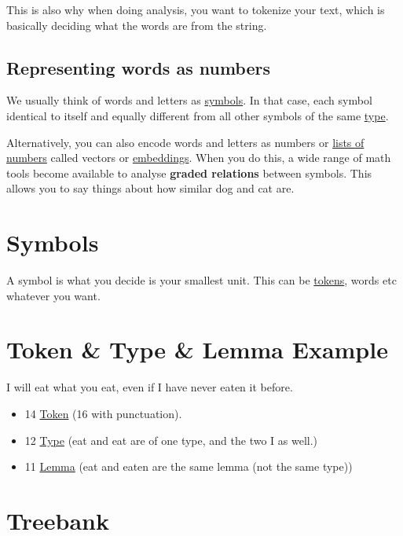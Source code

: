 \documentclass[
  11pt,
  british,
]{article}
\providecommand{\tightlist}{%
  \setlength{\itemsep}{0pt}\setlength{\parskip}{0pt}}
\begin{document}
This is also why when doing analysis, you want to tokenize your text,
which is basically deciding what the words are from the string.

\hypertarget{representing-words-as-numbers}{%
\subsection{Representing words as
numbers}\label{representing-words-as-numbers}}

We usually think of words and letters as \href{Symbol.md}{symbols}. In
that case, each symbol identical to itself and equally different from
all other symbols of the same \href{Type.md}{type}.

Alternatively, you can also encode words and letters as numbers or
\href{../Semantic-Similarity/Vector\%20semantics.md}{lists of numbers}
called vectors or
\href{../Semantic-Similarity/Embeddings.md}{embeddings}. When you do
this, a wide range of math tools become available to analyse
\textbf{graded relations} between symbols. This allows you to say things
about how similar dog and cat are.

\hypertarget{symbols}{%
\section{Symbols}\label{symbols}}

A symbol is what you decide is your smallest unit. This can be
\href{Token.md}{tokens}, words etc whatever you want.

\hypertarget{token-type-lemma-example}{%
\section{Token \& Type \& Lemma
Example}\label{token-type-lemma-example}}

I will eat what you eat, even if I have never eaten it before.

\begin{itemize}
\tightlist
\item
  14 \href{Token.md}{Token} (16 with punctuation).
\item
  12 \href{Type.md}{Type} (eat and eat are of one type, and the two I as
  well.)
\item
  11 \href{Lemma.md}{Lemma} (eat and eaten are the same lemma (not the
  same type))
\end{itemize}

\hypertarget{treebank}{%
\section{Treebank}\label{treebank}}
\end{document}

